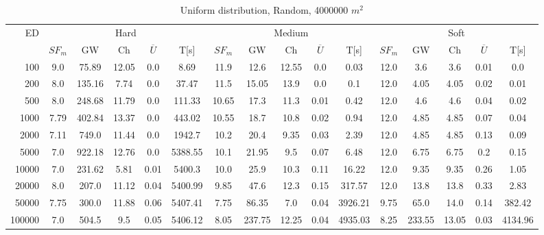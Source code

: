 \begin{table}[htb]
	\centering
	\begin{tabular}{|r|c|c|c|c|c|c|c|c|c|c|c|c|c|c|c|} 
		\hline
		\multirow{2}{*}{ED} & \multicolumn{5}{c|}{Hard} & \multicolumn{5}{c|}{Medium} &\multicolumn{5}{c|}{Soft} \\ 
		\cline{2-16} 
		&$SF_{m}$&GW & Ch & $\overline{U}$&T[s] &$SF_{m}$&GW & Ch & $\overline{U}$ &T[s] &$SF_{m}$&GW & Ch & $\overline{U}$  & T[s]  \\ 
		\hline 
		100 & 9.0 & 75.89 & 12.05 & 0.0 & 8.69 & 11.9 & 12.6 & 12.55 & 0.0 & 0.03 & 12.0 & 3.6 & 3.6 & 0.01 & 0.0\\ 
		200 & 8.0 & 135.16 & 7.74 & 0.0 & 37.47 & 11.5 & 15.05 & 13.9 & 0.0 & 0.1 & 12.0 & 4.05 & 4.05 & 0.02 & 0.01\\ 
		500 & 8.0 & 248.68 & 11.79 & 0.0 & 111.33 & 10.65 & 17.3 & 11.3 & 0.01 & 0.42 & 12.0 & 4.6 & 4.6 & 0.04 & 0.02\\ 
		1000 & 7.79 & 402.84 & 13.37 & 0.0 & 443.02 & 10.55 & 18.7 & 10.8 & 0.02 & 0.94 & 12.0 & 4.85 & 4.85 & 0.07 & 0.04\\ 
		2000 & 7.11 & 749.0 & 11.44 & 0.0 & 1942.7 & 10.2 & 20.4 & 9.35 & 0.03 & 2.39 & 12.0 & 4.85 & 4.85 & 0.13 & 0.09\\ 
		5000 & 7.0 & 922.18 & 12.76 & 0.0 & 5388.55 & 10.1 & 21.95 & 9.5 & 0.07 & 6.48 & 12.0 & 6.75 & 6.75 & 0.2 & 0.15\\ 
		10000 & 7.0 & 231.62 & 5.81 & 0.01 & 5400.3 & 10.0 & 25.9 & 10.3 & 0.11 & 16.22 & 12.0 & 9.35 & 9.35 & 0.26 & 1.05\\ 
		20000 & 8.0 & 207.0 & 11.12 & 0.04 & 5400.99 & 9.85 & 47.6 & 12.3 & 0.15 & 317.57 & 12.0 & 13.8 & 13.8 & 0.33 & 2.83\\ 
		50000 & 7.75 & 300.0 & 11.88 & 0.06 & 5407.41 & 7.75 & 86.35 & 7.0 & 0.04 & 3926.21 & 9.75 & 65.0 & 14.0 & 0.14 & 382.42\\ 
		100000 & 7.0 & 504.5 & 9.5 & 0.05 & 5406.12 & 8.05 & 237.75 & 12.25 & 0.04 & 4935.03 & 8.25 & 233.55 & 13.05 & 0.03 & 4134.96\\ 
		\hline 
	\end{tabular} 
	\caption{Uniform distribution, Random, 4000000 $m^2$} 
	\label{tab:UnRandom2000} 
\end{table} 
